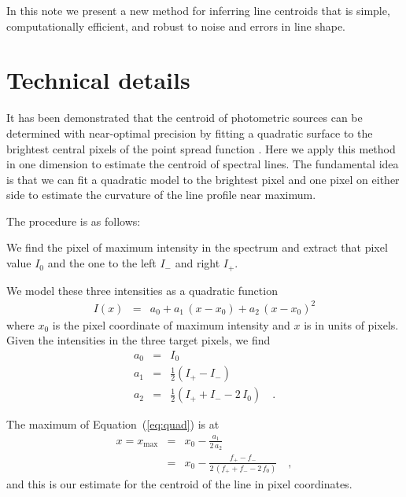 \documentclass[rnaas]{aastex62}
\renewcommand{\eqref}[1]{\ref{eq:#1}}
\newcommand{\Eq}[1]{Equation~(\eqref{#1})}
\newcommand{\eqlabel}[1]{\label{eq:#1}}
\begin{document}
In this note we present a new method for inferring line centroids that is
simple, computationally efficient, and robust to noise and errors in line
shape.

\section{Technical details}

It has been demonstrated that the centroid of photometric sources can be
determined with near-optimal precision by fitting a quadratic surface to the
brightest central pixels of the point spread function \citep{Vakili:2016}.
Here we apply this method in one dimension to estimate the centroid of
spectral lines.
The fundamental idea is that we can fit a quadratic model to the brightest
pixel and one pixel on either side to estimate the curvature of the line
profile near maximum.

The procedure is as follows:
\begin{enumerate}

{\item We find the pixel of maximum intensity in the spectrum and extract that
pixel value $I_0$ and the one to the left $I_-$ and right $I_+$.}

{\item We model these three intensities as a quadratic function
\begin{eqnarray}
I(x) &=& a_0 + a_1\,(x-x_0) + a_2\,{(x-x_0)}^2
\eqlabel{quad}
\end{eqnarray}
where $x_0$ is the pixel coordinate of maximum intensity and $x$ is in units
of pixels.
Given the intensities in the three target pixels, we find
\begin{eqnarray}
a_0 &=& I_0 \\
a_1 &=& \frac{1}{2}(I_+ - I_-) \\
a_2 &=& \frac{1}{2}(I_+ + I_- - 2\,I_0) \quad.
\end{eqnarray}
}

{\item The maximum of \Eq{quad} is at
\begin{eqnarray}
x = x_\mathrm{max} &=& x_0 - \frac{a_1}{2\,a_2} \\
    &=& x_0 - \frac{f_+ - f_-}{2\,(f_+ + f_- - 2\,f_0)} \quad,
\end{eqnarray}
and this is our estimate for the centroid of the line in pixel coordinates.
}

\end{enumerate}
\end{document}
